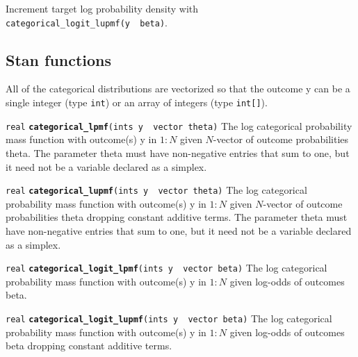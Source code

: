 \documentclass[
  10pt,
]{book}
\begin{document}
Increment target log probability density with \texttt{categorical\_logit\_lupmf(y\ \textbar{}\ beta)}.

\hypertarget{stan-functions-7}{%
\subsection{Stan functions}\label{stan-functions-7}}

All of the categorical distributions are vectorized so that the
outcome y can be a single integer (type \texttt{int}) or an array of integers
(type \texttt{int{[}{]}}).


\texttt{real} \textbf{\texttt{categorical\_lpmf}}\texttt{(ints\ y\ \textbar{}\ vector\ theta)}\newline
The log categorical probability mass function with outcome(s) y in
\(1:N\) given \(N\)-vector of outcome probabilities theta. The parameter
theta must have non-negative entries that sum to one, but it need not
be a variable declared as a simplex.


\texttt{real} \textbf{\texttt{categorical\_lupmf}}\texttt{(ints\ y\ \textbar{}\ vector\ theta)}\newline
The log categorical probability mass function with outcome(s) y in
\(1:N\) given \(N\)-vector of outcome probabilities theta dropping constant
additive terms. The parameter theta must have non-negative entries that sum
to one, but it need not be a variable declared as a simplex.


\texttt{real} \textbf{\texttt{categorical\_logit\_lpmf}}\texttt{(ints\ y\ \textbar{}\ vector\ beta)}\newline
The log categorical probability mass function with outcome(s) y in
\(1:N\) given log-odds of outcomes beta.


\texttt{real} \textbf{\texttt{categorical\_logit\_lupmf}}\texttt{(ints\ y\ \textbar{}\ vector\ beta)}\newline
The log categorical probability mass function with outcome(s) y in
\(1:N\) given log-odds of outcomes beta dropping constant additive terms.
\end{document}
